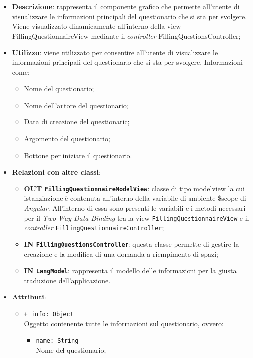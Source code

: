 		\begin{itemize}
			\item \textbf{Descrizione}: rappresenta il componente grafico che permette all'utente di visualizzare le informazioni principali del questionario che si sta per svolgere. Viene visualizzato dinamicamente all'interno della view FillingQuestionnaireView mediante il \textit{controller} FillingQuestionsController;
			\item \textbf{Utilizzo}: viene utilizzato per consentire all'utente di visualizzare le informazioni principali del questionario che si sta per svolgere. Informazioni come:
			\begin{itemize}
				\item Nome del questionario;
				\item Nome dell'autore del questionario;
				\item Data di creazione del questionario;
				\item Argomento del questionario;
				\item Bottone per iniziare il questionario.
			\end{itemize}
			\item \textbf{Relazioni con altre classi}: 
			\begin{itemize}
				\item \textbf{OUT \texttt{FillingQuestionnaireModelView}}: classe di tipo modelview la cui istanziazione è contenuta all'interno della variabile di ambiente \$scope di \textit{Angular}. All'interno di essa sono presenti le variabili e i metodi necessari per il \textit{Two-Way Data-Binding} tra la view \texttt{FillingQuestionnaireView} e il \textit{controller} \texttt{FillingQuestionnaireController};
				\item \textbf{IN \texttt{FillingQuestionsController}}: questa classe permette di gestire la creazione e la modifica di una domanda a riempimento di spazi;
				\item \textbf{IN \texttt{LangModel}}: rappresenta il modello delle informazioni per la giusta traduzione dell'applicazione.
			\end{itemize}
			\item \textbf{Attributi}:
			\begin{itemize}
				\item \texttt{+ info: Object} \\ Oggetto contenente tutte le informazioni sul questionario, ovvero:
				\begin{itemize}
					\item \texttt{name: String} \\ Nome del questionario;

\end{itemize}
\end{itemize}
\end{itemize}
